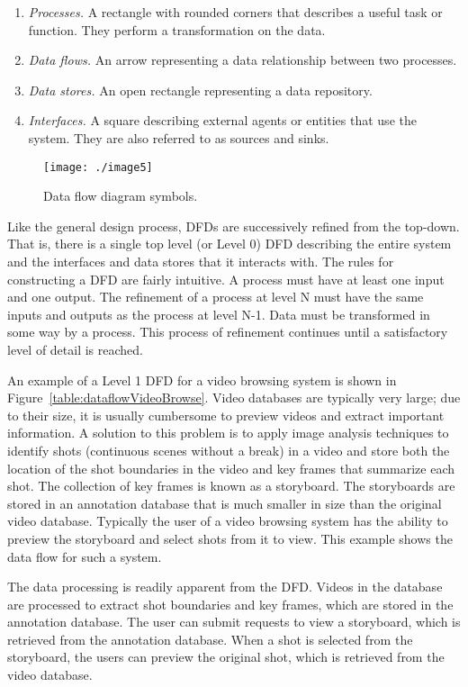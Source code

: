 \begin{enumerate}
\def\labelenumi{\arabic{enumi}.}
\item
  \emph{Processes.} A rectangle with rounded corners that describes a
  useful task or function. They perform a transformation on the data.
\item
  \emph{Data flows.} An arrow representing a data relationship between
  two processes.
\item
  \emph{Data stores.} An open rectangle representing a data repository.
\item
  \emph{Interfaces.} A square describing external agents or entities
  that use the system. They are also referred to as sources and sinks.
\end{enumerate}


\begin{figure}
\texttt{[image: ./image5]}
\caption{Data flow diagram symbols.}
\label{figure:dataFlowSymbols}
\end{figure}


Like the general design process, DFDs are successively refined from the
top-down. That is, there is a single top level (or Level 0) DFD
describing the entire system and the interfaces and data stores that it
interacts with. The rules for constructing a DFD are fairly intuitive. A
process must have at least one input and one output. The refinement of a
process at level N must have the same inputs and outputs as the process
at level N-1. Data must be transformed in some way by a process. This
process of refinement continues until a satisfactory level of detail is
reached.

An example of a Level 1 DFD for a video browsing system is shown in
Figure~\ref{table:dataflowVideoBrowse}. Video databases are typically 
very large; due to their size,
it is usually cumbersome to preview videos and extract important
information. A solution to this problem is to apply image analysis
techniques to identify shots (continuous scenes without a break) in a
video and store both the location of the shot boundaries in the video
and key frames that summarize each shot. The collection of key frames is
known as a storyboard. The storyboards are stored in an annotation
database that is much smaller in size than the original video database.
Typically the user of a video browsing system has the ability to preview
the storyboard and select shots from it to view. This example shows the
data flow for such a system.

The data processing is readily apparent from the DFD. Videos in the
database are processed to extract shot boundaries and key frames, which
are stored in the annotation database. The user can submit requests to
view a storyboard, which is retrieved from the annotation database. When
a shot is selected from the storyboard, the users can preview the
original shot, which is retrieved from the video database.

